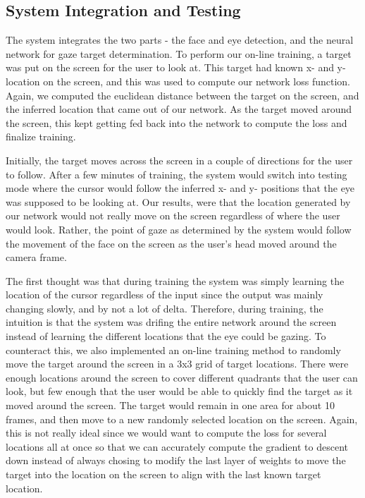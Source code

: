 \documentclass[10pt,twocolumn,letterpaper]{article}
\begin{document}
\subsection{System Integration and Testing}
The system integrates the two parts - the face and eye detection, and
the neural network for gaze target determination. To perform our
on-line training, a target was put on the screen for the user to look
at. This target had known x- and y- location on the screen, and this
was used to compute our network loss function. Again, we computed the
euclidean distance between the target on the screen, and the inferred
location that came out of our network. As the target moved around the
screen, this kept getting fed back into the network to compute the
loss and finalize training.

Initially, the target moves across the screen in a couple of
directions for the user to follow. After a few minutes of training,
the system would switch into testing mode where the cursor would
follow the inferred x- and y- positions that the eye was supposed to
be looking at. Our results, were that the location generated by our
network would not really move on the screen regardless of where the
user would look. Rather, the point of gaze as determined by the system
would follow the movement of the face on the screen as the user's head
moved around the camera frame.

The first thought was that during training the system was simply
learning the location of the cursor regardless of the input since the
output was mainly changing slowly, and by not a lot of
delta. Therefore, during training, the intuition is that the system
was drifing the entire network around the screen instead of learning
the different locations that the eye could be gazing. To counteract
this, we also implemented an on-line training method to randomly move
the target around the screen in a 3x3 grid of target locations. There
were enough locations around the screen to cover different quadrants
that the user can look, but few enough that the user would be able to
quickly find the target as it moved around the screen. The target
would remain in one area for about 10 frames, and then move to a new
randomly selected location on the screen. Again, this is not really
ideal since we would want to compute the loss for several locations
all at once so that we can accurately compute the gradient to descent
down instead of always chosing to modify the last layer of weights to
move the target into the location on the screen to align with the last
known target location. 
\end{document}
